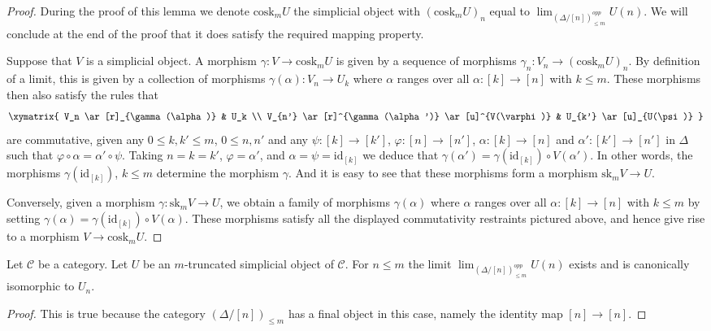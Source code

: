 \begin{proof}
During the proof of this lemma we denote $\text{cosk}_mU$ the
simplicial object with $(\text{cosk}_mU)_n$ equal to
$\lim_{(\Delta/[n])_{\leq m}^{opp}} U(n)$.
We will conclude at the end of the proof that it does
satisfy the required mapping property.

\medskip\noindent
Suppose that $V$ is a simplicial object.
A morphism $\gamma : V \to \text{cosk}_mU$ is given by a sequence
of morphisms $\gamma_n : V_n \to (\text{cosk}_mU)_n$.
By definition of a limit, this is given by a
collection of morphisms $\gamma(\alpha) : V_n \to U_k$
where $\alpha$ ranges over all $\alpha : [k] \to [n]$
with $k \leq m$. These morphisms then also satisfy
the rules that
$$
\xymatrix{
V_n \ar[r]_{\gamma(\alpha)} &  U_k \\
V_{n'} \ar[r]^{\gamma(\alpha')} \ar[u]^{V(\varphi)} & U_{k'} \ar[u]_{U(\psi)}
}
$$
are commutative, given any $0 \leq k, k' \leq m$, $0 \leq n, n'$
and any $\psi : [k] \to [k']$, $\varphi : [n] \to [n']$,
$\alpha : [k] \to [n]$ and $\alpha' : [k'] \to [n']$ in $\Delta$
such that $\varphi \circ \alpha = \alpha' \circ \psi$.
Taking $n = k = k'$, $\varphi = \alpha'$, and $\alpha = \psi = \text{id}_{[k]}$
we deduce that $\gamma(\alpha') = \gamma(\text{id}_{[k]}) \circ V(\alpha')$.
In other words, the morphisms $\gamma(\text{id}_{[k]})$, $k \leq m$
determine the morphism $\gamma$. And it is easy to see that these
morphisms form a morphism $\text{sk}_m V \to U$.

\medskip\noindent
Conversely, given a morphism $\gamma : \text{sk}_m V \to U$,
we obtain a family of morphisms $\gamma(\alpha)$
where $\alpha$ ranges over all $\alpha : [k] \to [n]$
with $k \leq m$ by setting $\gamma(\alpha) =
\gamma(\text{id}_{[k]}) \circ V(\alpha)$. These morphisms
satisfy all the displayed commutativity restraints pictured
above, and hence give rise to a morphism $V \to \text{cosk}_m U$.
\end{proof}

\begin{lemma}
\label{lemma-trivial-cosk}
Let $\mathcal{C}$ be a category.
Let $U$ be an $m$-truncated simplicial object of $\mathcal{C}$.
For $n \leq m$ the limit $\lim_{(\Delta/[n])_{\leq m}^{opp}} U(n)$
exists and is canonically isomorphic to $U_n$.
\end{lemma}

\begin{proof}
This is true because the category $(\Delta/[n])_{\leq m}$
has a final object in this case, namely the identity
map $[n] \to [n]$.
\end{proof}

